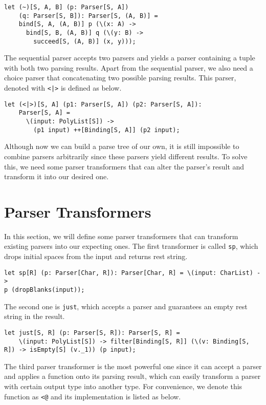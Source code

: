 \begin{lstlisting}
let (~)[S, A, B] (p: Parser[S, A])
    (q: Parser[S, B]): Parser[S, (A, B)] =
	bind[S, A, (A, B)] p (\(x: A) ->
	  bind[S, B, (A, B)] q (\(y: B) ->
	    succeed[S, (A, B)] (x, y)));
\end{lstlisting}

The sequential parser accepts two parsers and yields a parser containing a tuple with both two parsing results. Apart from the sequential parser, we also need a choice parser that concatenating two possible parsing results. This parser, denoted with \texttt{<|>} is defined as below.

\begin{lstlisting}
let (<|>)[S, A] (p1: Parser[S, A]) (p2: Parser[S, A]):
    Parser[S, A] =
	  \(input: PolyList[S]) ->
	    (p1 input) ++[Binding[S, A]] (p2 input);
\end{lstlisting}

Although now we can build a parse tree of our own, it is still impossible to combine parsers arbitrarily since these parsers yield different results. To solve this, we need some parser transformers that can alter the parser's result and transform it into our desired one.

\section{Parser Transformers}
In this section, we will define some parser transformers that can transform existing parsers into our expecting ones. The first transformer is called \texttt{sp}, which drops initial spaces from the input and returns rest string.

\begin{lstlisting}
let sp[R] (p: Parser[Char, R]): Parser[Char, R] = \(input: CharList) ->
p (dropBlanks(input));
\end{lstlisting}

The second one is \texttt{just}, which accepts a parser and guarantees an empty rest string in the result.

\begin{lstlisting}
let just[S, R] (p: Parser[S, R]): Parser[S, R] =
    \(input: PolyList[S]) -> filter[Binding[S, R]] (\(v: Binding[S, R]) -> isEmpty[S] (v._1)) (p input);
\end{lstlisting}

The third parser transformer is the most powerful one since it can accept a parser and applies a function onto its parsing result, which can easily transform a parser with certain output type into another type. For convenience, we denote this function as \texttt{<@} and its implementation is listed as below.

